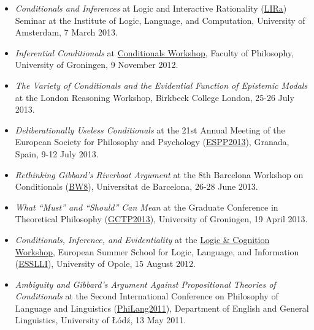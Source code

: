 \documentclass[a4paper,12pt]{article}
\begin{document}
\begin{small}
  \begin{itemize}
  \item \emph{Conditionals and Inferences} at Logic and Interactive
    Rationality (\href{http://www.illc.uva.nl/lgc/seminar/}{LIRa})
    Seminar at the Institute of Logic, Language, and Computation,
    University of Amsterdam, 7 March 2013.
  \item \emph{Inferential Conditionals} at
    \href{https://sites.google.com/site/jannekehuitink/workshop}{Conditionals
      Workshop}, Faculty of Philosophy, University of Groningen, 9
    November 2012.
  \end{itemize}
  
  \begin{itemize}

  \item \emph{The Variety of Conditionals and the Evidential Function
      of Epistemic Modals} at the London Reasoning Workshop, Birkbeck
    College London, 25-26 July 2013.

  \item \emph{Deliberationally Useless Conditionals} at the 21st
    Annual Meeting of the European Society for Philosophy and
    Psychology (\href{http://espp2013.com}{ESPP2013}), Granada, Spain,
    9-12 July 2013.

  \item \emph{Rethinking Gibbard’s Riverboat Argument} at the 8th
    Barcelona Workshop on Conditionals
    (\href{http://www.ub.edu/logosbw/bw8/index.html}{BW8}),
    Universitat de Barcelona, 26-28 June 2013.
    
  \item \emph{What ``Must'' and ``Should'' Can Mean} at the Graduate
    Conference in Theoretical Philosophy
    (\href{http://www.philos.rug.nl/GCTP2013/}{GCTP2013}), University
    of Groningen, 19 April
    2013. %
    
  \item \emph{Conditionals, Inference, and Evidentiality} at the
    \href{http://www.ai.rug.nl/SocialCognition/logic-cognition/}{Logic
      \& Cognition Workshop}, European Summer School for Logic,
    Language, and Information
    (\href{http://www.esslli2012.pl}{ESSLLI}), University of Opole, 15
    August
    2012. %

  \item \emph{Ambiguity and Gibbard's Argument Against Propositional
      Theories of Conditionals} at the Second International Conference
    on Philosophy of Language and Linguistics
    (\href{http://ia.uni.lodz.pl/linguistics/events/philang-2011}{PhiLang2011}),
    Department of English and General Linguistics, University of Łódź,
    13 May
    2011. %


\end{itemize}
\end{small}
\end{document}
